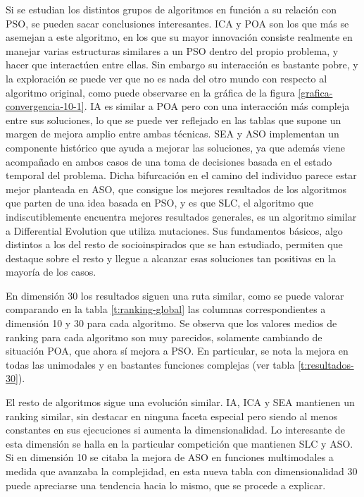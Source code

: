 Si se estudian los distintos grupos de algoritmos en función a su relación con PSO, se pueden sacar conclusiones interesantes. ICA y POA son los que más se asemejan a este algoritmo, en los que su mayor innovación consiste realmente en manejar varias estructuras similares a un PSO dentro del propio problema, y hacer que interactúen entre ellas. Sin embargo su interacción es bastante pobre, y la exploración se puede ver que no es nada del otro mundo con respecto al algoritmo original, como puede observarse en la gráfica de la figura \ref{grafica-convergencia-10-1}. IA es similar a POA pero con una interacción más compleja entre sus soluciones, lo que se puede ver reflejado en las tablas que supone un margen de mejora amplio entre ambas técnicas. SEA y ASO implementan un componente histórico que ayuda a mejorar las soluciones, ya que además viene acompañado en ambos casos de una toma de decisiones basada en el estado temporal del problema. Dicha bifurcación en el camino del individuo parece estar mejor planteada en ASO, que consigue los mejores resultados de los algoritmos que parten de una idea basada en PSO, y es que SLC, el algoritmo que indiscutiblemente encuentra mejores resultados generales, es un algoritmo similar a Differential Evolution que utiliza mutaciones. Sus fundamentos básicos, algo distintos a los del resto de socioinspirados que se han estudiado, permiten que destaque sobre el resto y llegue a alcanzar esas soluciones tan positivas en la mayoría de los casos.

En dimensión 30 los resultados siguen una ruta similar, como se puede valorar comparando en la tabla \ref{t:ranking-global} las columnas correspondientes a dimensión 10 y 30 para cada algoritmo. Se observa que los valores medios de ranking para cada algoritmo son muy parecidos, solamente cambiando de situación POA, que ahora sí mejora a PSO. En particular, se nota la mejora en todas las unimodales y en bastantes funciones complejas (ver tabla \ref{t:resultados-30}).

El resto de algoritmos sigue una evolución similar. IA, ICA y SEA mantienen un ranking similar, sin destacar en ninguna faceta especial pero siendo al menos constantes en sus ejecuciones si aumenta la dimensionalidad. Lo interesante de esta dimensión se halla en la particular competición que mantienen SLC y ASO. Si en dimensión 10 se citaba la mejora de ASO en funciones multimodales a medida que avanzaba la complejidad, en esta nueva tabla con dimensionalidad 30 puede apreciarse una tendencia hacia lo mismo, que se procede a explicar.

